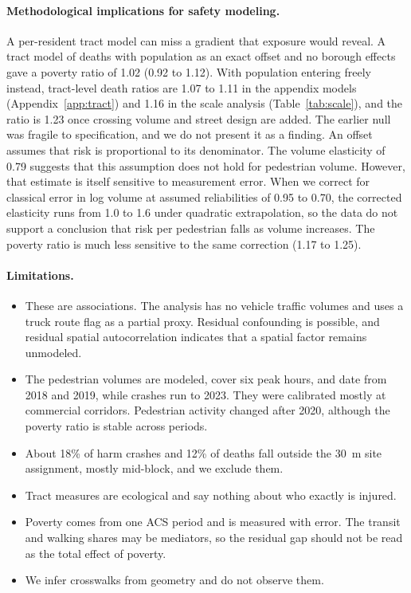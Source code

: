 \documentclass[10pt,twocolumn]{article}
\begin{document}
\paragraph{Methodological implications for safety modeling.} A per-resident tract model can miss a gradient that exposure would reveal. A tract model of deaths with population as an exact offset and no borough effects gave a poverty ratio of 1.02 (0.92 to 1.12). With population entering freely instead, tract-level death ratios are 1.07 to 1.11 in the appendix models (Appendix~\ref{app:tract}) and 1.16 in the scale analysis (Table~\ref{tab:scale}), and the ratio is 1.23 once crossing volume and street design are added. The earlier null was fragile to specification, and we do not present it as a finding. An offset assumes that risk is proportional to its denominator. The volume elasticity of 0.79 suggests that this assumption does not hold for pedestrian volume. However, that estimate is itself sensitive to measurement error. When we correct for classical error in log volume at assumed reliabilities of 0.95 to 0.70, the corrected elasticity runs from 1.0 to 1.6 under quadratic extrapolation, so the data do not support a conclusion that risk per pedestrian falls as volume increases. The poverty ratio is much less sensitive to the same correction (1.17 to 1.25).

\paragraph{Limitations.}
\begin{itemize}
\item These are associations. The analysis has no vehicle traffic volumes and uses a truck route flag as a partial proxy. Residual confounding is possible, and residual spatial autocorrelation indicates that a spatial factor remains unmodeled.
\item The pedestrian volumes are modeled, cover six peak hours, and date from 2018 and 2019, while crashes run to 2023. They were calibrated mostly at commercial corridors. Pedestrian activity changed after 2020, although the poverty ratio is stable across periods.
\item About 18\% of harm crashes and 12\% of deaths fall outside the 30~m site assignment, mostly mid-block, and we exclude them.
\item Tract measures are ecological and say nothing about who exactly is injured.
\item Poverty comes from one ACS period and is measured with error. The transit and walking shares may be mediators, so the residual gap should not be read as the total effect of poverty.
\item We infer crosswalks from geometry and do not observe them.
\end{itemize}
\end{document}
